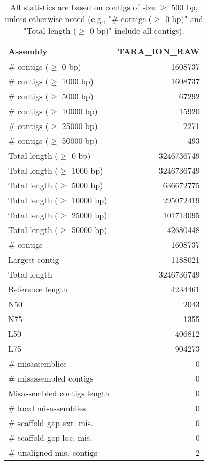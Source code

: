 \documentclass[12pt,a4paper]{article}
\begin{document}
\begin{table}[ht]
\begin{center}
\caption{All statistics are based on contigs of size $\geq$ 500 bp, unless otherwise noted (e.g., "\# contigs ($\geq$ 0 bp)" and "Total length ($\geq$ 0 bp)" include all contigs).}
\begin{tabular}{|l*{1}{|r}|}
\hline
Assembly & TARA\_ION\_RAW \\ \hline
\# contigs ($\geq$ 0 bp) & 1608737 \\ \hline
\# contigs ($\geq$ 1000 bp) & 1608737 \\ \hline
\# contigs ($\geq$ 5000 bp) & 67292 \\ \hline
\# contigs ($\geq$ 10000 bp) & 15920 \\ \hline
\# contigs ($\geq$ 25000 bp) & 2271 \\ \hline
\# contigs ($\geq$ 50000 bp) & 493 \\ \hline
Total length ($\geq$ 0 bp) & 3246736749 \\ \hline
Total length ($\geq$ 1000 bp) & 3246736749 \\ \hline
Total length ($\geq$ 5000 bp) & 636672775 \\ \hline
Total length ($\geq$ 10000 bp) & 295072419 \\ \hline
Total length ($\geq$ 25000 bp) & 101713095 \\ \hline
Total length ($\geq$ 50000 bp) & 42680448 \\ \hline
\# contigs & 1608737 \\ \hline
Largest contig & 1188021 \\ \hline
Total length & 3246736749 \\ \hline
Reference length & 4234461 \\ \hline
N50 & 2043 \\ \hline
N75 & 1355 \\ \hline
L50 & 406812 \\ \hline
L75 & 904273 \\ \hline
\# misassemblies & 0 \\ \hline
\# misassembled contigs & 0 \\ \hline
Misassembled contigs length & 0 \\ \hline
\# local misassemblies & 0 \\ \hline
\# scaffold gap ext. mis. & 0 \\ \hline
\# scaffold gap loc. mis. & 0 \\ \hline
\# unaligned mis. contigs & 2 \\ \hline

\end{tabular}
\end{center}
\end{table}
\end{document}
